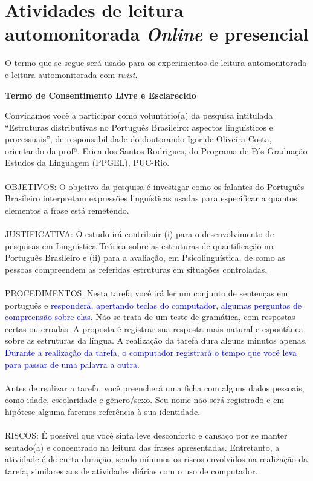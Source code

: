 \section{Atividades de leitura automonitorada \emph{Online} e presencial}
O termo que se segue será usado para os experimentos de leitura automonitorada e leitura automonitorada com \emph{twist}.

\begin{center}
  \textbf{Termo de Consentimento Livre e Esclarecido}
\end{center}
Convidamos você a participar como voluntário(a) da pesquisa intitulada ``Estruturas distributivas no Português Brasileiro: aspectos linguísticos e processuais'', de responsabilidade do doutorando Igor de Oliveira Costa, orientando da profª. Erica dos Santos Rodrigues, do Programa de Pós-Graduação Estudos da Linguagem (PPGEL), PUC-Rio.
\\
\\
OBJETIVOS: O objetivo da pesquisa é investigar como os falantes do Português Brasileiro interpretam expressões linguísticas usadas para especificar a quantos elementos a frase está remetendo.
\\
\\
JUSTIFICATIVA: O estudo irá contribuir (i) para o desenvolvimento de pesquisas em Linguística Teórica sobre as estruturas de quantificação no Português Brasileiro e (ii) para a avaliação, em Psicolinguística, de como as pessoas compreendem as referidas estruturas em situações controladas.
\\
\\
PROCEDIMENTOS: Nesta tarefa você irá ler um conjunto de sentenças em português e \textcolor{blue}{responderá, apertando teclas do computador, algumas perguntas de compreensão sobre elas}. Não se trata de um teste de gramática, com respostas certas ou erradas. A proposta é registrar sua resposta mais natural e espontânea sobre as estruturas da língua. A realização da tarefa dura alguns minutos apenas. \textcolor{blue}{Durante a realização da tarefa, o computador registrará o tempo que você leva para passar de uma palavra a outra.}
\\
\\
Antes de realizar a tarefa, você preencherá uma ficha com alguns dados pessoais, como idade, escolaridade e gênero/sexo. Seu nome não será registrado e em hipótese alguma faremos referência à sua identidade.
\\
\\
RISCOS: É possível que você sinta leve desconforto e cansaço por se manter sentado(a) e concentrado na leitura das frases apresentadas. Entretanto, a atividade é de curta duração, sendo mínimos os riscos envolvidos na realização da tarefa, similares aos de atividades diárias com o uso de computador.
